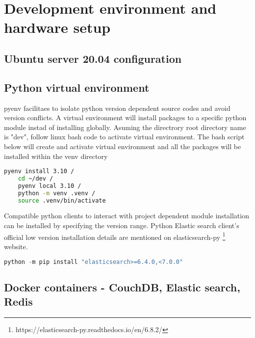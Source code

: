 \chapter{Development environment and hardware setup}

\section {Ubuntu server 20.04 configuration}

\section {Python virtual environment} \label {pyenv}

pyenv facilitaes to isolate python version dependent source codes and avoid version conflicts. A virtual environment will install packages to a specific python module instad of installing globally. Asuming the directrory root directory name is "dev", follow linux bash code to activate virtual environment. 
The bash script below will create and activate virtual environment and all the packages will be installed within the venv directory
\begin{lstlisting}[language=bash]
    pyenv install 3.10 /
    cd ~/dev /
    pyenv local 3.10 /
    python -m venv .venv /
    source .venv/bin/activate

\end{lstlisting}

Compatible python clients to interact with project dependent module installation can be installed by specifying the version range.
Python Elastic search client's official low version installation details are mentioned on elasticsearch-py \footnote{https://elasticsearch-py.readthedocs.io/en/6.8.2/} website.

\begin{lstlisting}[language=Python]
    python -m pip install "elasticsearch>=6.4.0,<7.0.0"
\end{lstlisting}

\section {Docker containers - CouchDB, Elastic search, Redis}